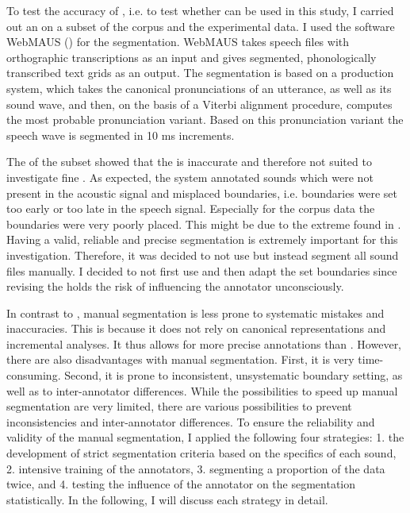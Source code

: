 To test the accuracy of , i.e. to test whether  can be used in this study, I carried out an  on a subset of the corpus and the experimental data. I used the software WebMAUS (\citealt{Schiel.1999,Kisler.2016}) for the segmentation.  WebMAUS takes speech files with orthographic transcriptions as an input and gives segmented, phonologically transcribed text grids as an output. The segmentation is based on a production system, which takes the canonical pronunciations of an utterance, as well as its sound wave, and then, on the basis of a Viterbi alignment procedure, computes the most probable pronunciation variant. Based on this pronunciation variant the speech wave is segmented in 10 ms increments. 
 
 
 The  of the subset showed that the  is inaccurate and therefore not suited to investigate fine . As expected, the system annotated sounds which were not present in the acoustic signal and misplaced boundaries, i.e. boundaries were set too early or too late in the speech signal. Especially for the corpus data the boundaries were very poorly placed. This might be due to the extreme  found in . 
 Having a valid, reliable and precise segmentation is extremely important for this investigation. Therefore, it was decided to not use  but instead segment all sound files manually. I decided to not first use  and then adapt the set boundaries since revising the  holds the risk of influencing the annotator unconsciously. 
 

In contrast to , manual segmentation is less prone to systematic mistakes and inaccuracies. This is because it does not rely on canonical representations and incremental analyses. It thus allows for more precise annotations than .  However, there are also disadvantages with manual segmentation. 
First, it is very time-consuming. Second, it is prone to inconsistent, unsystematic boundary setting, as well as to inter-annotator differences. While the possibilities to speed up manual segmentation are very limited, there are various possibilities to prevent inconsistencies and inter-annotator differences. To ensure the reliability and validity of the manual segmentation, I applied the following four strategies: 1.  the development of strict segmentation criteria based on the specifics of each sound, 2.  intensive training of the annotators, 3. segmenting a proportion of the data twice, and 4. testing the influence of the annotator on the segmentation statistically. In the following, I will discuss each strategy in detail.\\


